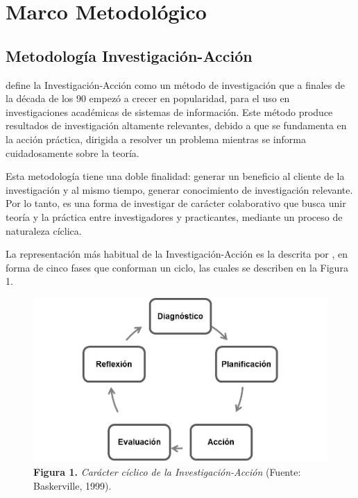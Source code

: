 \chapter{\label{cap:3}Marco Metodol\'{o}gico}

	\section{Metodolog\'{i}a Investigaci\'{o}n-Acci\'{o}n}
	\cite{Baskerville} define la Investigaci\'{o}n-Acci\'{o}n como un m\'{e}todo de investigaci\'{o}n que a finales de la d\'{e}cada de los 90 empez\'{o} a crecer en popularidad, para el uso en investigaciones acad\'{e}micas de sistemas de informaci\'{o}n. Este m\'{e}todo produce resultados de investigaci\'{o}n altamente relevantes, debido a que se fundamenta en la acci\'{o}n pr\'{a}ctica, dirigida a resolver un problema mientras se informa cuidadosamente sobre la teor\'{i}a.

	Esta metodolog\'{i}a tiene una doble finalidad: generar un beneficio al cliente de la investigaci\'{o}n y al mismo tiempo, generar conocimiento de investigaci\'{o}n relevante. Por lo tanto, es una forma de investigar de car\'{a}cter colaborativo que busca unir teor\'{i}a y la pr\'{a}ctica entre investigadores y practicantes, mediante un proceso de naturaleza c\'{i}clica.

	La representaci\'{o}n m\'{a}s habitual de la Investigaci\'{o}n-Acci\'{o}n es la descrita por \cite{Baskerville}, en forma de cinco fases que conforman un ciclo, las cuales se describen en la Figura 1.

\FloatBarrier %
\vline
	\begin{figure}
		\centering
		\includegraphics[scale=0.77]{img/investigacion-accion.png}
			\caption{\textbf{Figura 1.} \textit{Car\'{a}cter c\'{i}clico de la Investigaci\'{o}n-Acci\'{o}n} (Fuente: Baskerville, 1999).}
	\end{figure}
\FloatBarrier %

